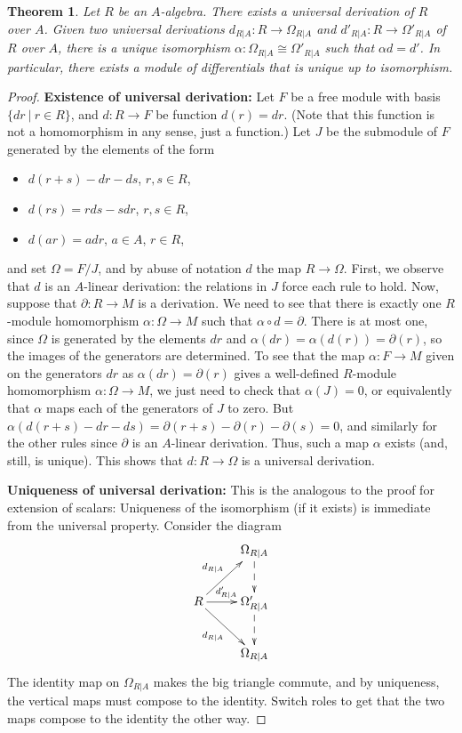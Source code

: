 \documentclass{amsart}[12pt]
\numberwithin{equation}{section}
\theoremstyle{plain} %
\newtheorem{thm}[equation]{Theorem}
\theoremstyle{definition}
\theoremstyle{remark}
\begin{document}
\begin{thm} Let $R$ be an $A$-algebra. There exists a universal derivation of $R$ over $A$. Given two universal derivations $d_{R|A}:R\to\Omega_{R|A}$ and $d'_{R|A}:R\to \Omega'_{R|A}$ of $R$ over $A$, there is a unique isomorphism $\alpha:\Omega_{R|A} \cong \Omega'_{R|A}$ such that $\alpha d = d'$. In particular, there exists a module of differentials that is unique up to isomorphism.
\end{thm}
\begin{proof}
\textbf{Existence of universal derivation:} Let $F$ be a free module with basis $\{dr \ | \ r\in R\}$, and $d:R\to F$ be function $d(r) = dr$. (Note that this function is not a  homomorphism in any sense, just a function.) Let $J$ be the submodule of $F$ generated by the elements of the form
\begin{itemize}
\item $d(r+s) - dr -ds$, $r,s\in R$,
\item $d(rs) = r ds - s dr$, $r,s\in R$,
\item $d(ar) = a dr$, $a\in A$, $r\in R$,
\end{itemize}
and set $\Omega=F/J$, and by abuse of notation $d$ the map $R\to \Omega$. First, we observe that $d$ is an $A$-linear derivation: the relations in $J$ force each rule to hold.
Now, suppose that $\partial:R\to M$ is a derivation. We need to see that there is exactly one $R$-module homomorphism $\alpha:\Omega\to M$ such that $\alpha\circ d = \partial$.
There is at most one, since $\Omega$ is generated by the elements $dr$ and $\alpha(dr) = \alpha(d(r)) = \partial(r)$, so the images of the generators are determined. To see that the map $\alpha:F\to M$ given on the generators $dr$ as $\alpha(dr) = \partial(r)$ gives a well-defined $R$-module homomorphism $\alpha:\Omega\to M$, we just need to check that $\alpha(J)=0$, or equivalently that $\alpha$ maps each of the generators of $J$ to zero. But $\alpha( d(r+s) - dr - ds ) = \partial(r+s) - \partial(r) - \partial(s) = 0$, and similarly for the other rules since $\partial$ is an $A$-linear derivation. Thus, such a map $\alpha$ exists (and, still, is unique). This shows that $d:R\to \Omega$ is a universal derivation.

\textbf{Uniqueness of universal derivation:} This is the analogous to the proof for extension of scalars: Uniqueness of the isomorphism (if it exists) is immediate from the universal property. Consider the diagram
\[ \xymatrix{  & \Omega_{R|A} \ar@{-->}[d]\\
R \ar[ur]^{d_{R|A}} \ar[r]^{d'_{R|A}} \ar[dr]_{d_{R|A}} & \Omega'_{R|A}\ar@{-->}[d] \\
& \Omega_{R|A}}\]
The identity map on $\Omega_{R|A}$ makes the big triangle commute, and by uniqueness, the vertical maps must compose to the identity. Switch roles to get that the two maps compose to the identity the other way.
\end{proof}
\end{document}
